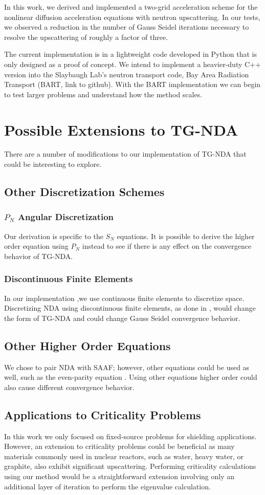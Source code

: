 
In this work, we derived and implemented a two-grid acceleration scheme for the nonlinear diffusion acceleration equations with neutron upscattering. In our tests, we observed a reduction in the number of Gauss Seidel iterations necessary to resolve the upscattering of roughly a factor of three. 

The current implementation is in a lightweight code developed in Python that is only designed as a proof of concept. We intend to implement a heavier-duty C++ version into the Slaybaugh Lab's neutron transport code, Bay Area Radiation Transport (BART, link to github). With the BART implementation we can begin to test larger problems and understand how the method scales.

\section{Possible Extensions to TG-NDA}
There are a number of modifications to our implementation of TG-NDA that could be interesting to explore. 

\subsection{Other Discretization Schemes}
\subsubsection{$P_N$ Angular Discretization}
Our derivation is specific to the $S_N$ equations. It is possible to derive the higher order equation using $P_N$ instead \cite{zheng-thesis} to see if there is any effect on the convergence behavior of TG-NDA. 
\subsubsection{Discontinuous Finite Elements}
In our implementation ,we use continuous finite elements to discretize space. Discretizing NDA using discontinuous finite elements, as done in \cite{Schunert2017}, would change the form of TG-NDA and could change Gauss Seidel convergence behavior. 
\subsection{Other Higher Order Equations}
We chose to pair NDA with SAAF; however, other equations could be used as well, such as the even-parity equation \cite{Noh1996}. Using other equations higher order could also cause different convergence behavior. 
\subsection{Applications to Criticality Problems}
In this work we only focused on fixed-source problems for shielding applications. However, an extension to criticality problems could be beneficial as many materials commonly used in nuclear reactors, such as water, heavy water, or graphite, also exhibit significant upscattering. Performing criticality calculations using our method would be a straightforward extension involving only an additional layer of iteration to perform the eigenvalue calculation. 